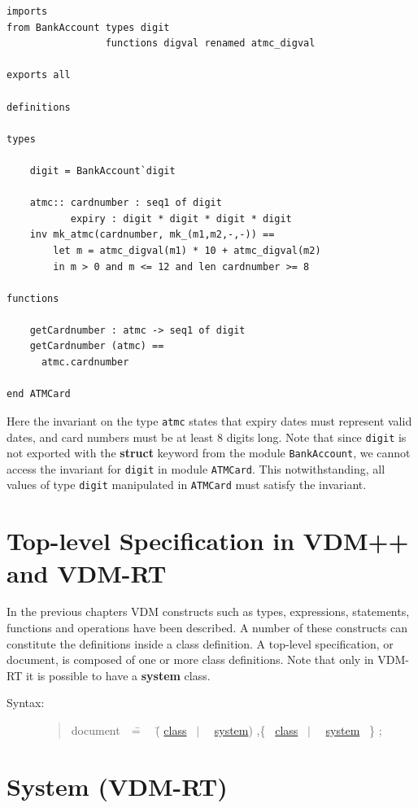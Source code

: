 \documentclass{overturerepchap}
\newcommand{\Rule}[2]{
  \begin{quote}\begin{tabbing}
    #1\index{#1}\ \ \= = \ \ \= #2  ; %

  \end{tabbing}\end{quote}
  }
\newcommand{\Ruleref}[1]{
  \hyperlink{rule:#1}{#1}}
\newcommand{\SeqPt}[1]{\{\ #1\ \}}
\newcommand{\dsepl}{\ $|$\ }
\newcommand{\keyw}[1]{{\bf\ttfamily #1}}
\begin{document}
{\begin{description}
\begin{lstlisting}
imports
from BankAccount types digit
                 functions digval renamed atmc_digval

exports all

definitions

types

    digit = BankAccount`digit

    atmc:: cardnumber : seq1 of digit
           expiry : digit * digit * digit * digit
    inv mk_atmc(cardnumber, mk_(m1,m2,-,-)) ==
        let m = atmc_digval(m1) * 10 + atmc_digval(m2) 
        in m > 0 and m <= 12 and len cardnumber >= 8

functions

    getCardnumber : atmc -> seq1 of digit
    getCardnumber (atmc) ==
      atmc.cardnumber

end ATMCard
\end{lstlisting}
Here the invariant on the type \texttt{atmc} states that expiry dates
must represent valid dates, and card numbers must be at least 8 digits
long. Note that since \texttt{digit} is not exported with the
\keyw{struct} keyword from the module \texttt{BankAccount}, we cannot
access the invariant for \texttt{digit} in module
\texttt{ATMCard}. This notwithstanding, all values of type
\texttt{digit} manipulated in \texttt{ATMCard} must satisfy the
invariant.

\end{description}

\section{Top-level Specification in VDM++ and VDM-RT}

In the previous chapters VDM constructs such as types,
expressions, statements, functions and operations have been
described. A number of these constructs can constitute the definitions
inside a class definition. A top-level specification, or document, is
composed of one or more class definitions. Note that only in VDM-RT it
is possible to have a \keyw{system} class.

\begin{description}
\item[Syntax:]
\Rule{document}{
   (\Ruleref{class}
   \dsepl\ \Ruleref{system})
   ,\SeqPt{\Ruleref{class}
   \dsepl\ \Ruleref{system}
         }
  }
\end{description}

\section{System (VDM-RT) }\label{sec:system}

}
\end{document}
